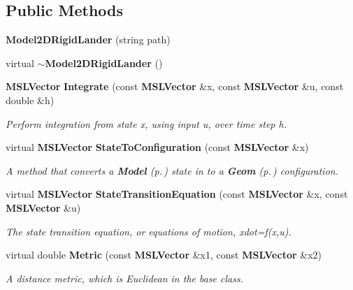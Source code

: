 \subsection*{Public Methods}
\begin{CompactItemize}
\item 
{\bf Model2DRigid\-Lander} (string path)
\item 
virtual {\bf $\sim$Model2DRigid\-Lander} ()
\item 
{\bf MSLVector} {\bf Integrate} (const {\bf MSLVector} \&x, const {\bf MSLVector} \&u, const double \&h)
\begin{CompactList}\small\item\em Perform integration from state x, using input u, over time step h.\item\end{CompactList}\item 
virtual {\bf MSLVector} {\bf State\-To\-Configuration} (const {\bf MSLVector} \&x)
\begin{CompactList}\small\item\em A method that converts a {\bf Model} {\rm (p.\,\pageref{class_Model})} state in to a {\bf Geom} {\rm (p.\,\pageref{class_Geom})} configuration.\item\end{CompactList}\item 
virtual {\bf MSLVector} {\bf State\-Transition\-Equation} (const {\bf MSLVector} \&x, const {\bf MSLVector} \&u)
\begin{CompactList}\small\item\em The state transition equation, or equations of motion, xdot=f(x,u).\item\end{CompactList}\item 
virtual double {\bf Metric} (const {\bf MSLVector} \&x1, const {\bf MSLVector} \&x2)
\begin{CompactList}\small\item\em A distance metric, which is Euclidean in the base class.\item\end{CompactList}\end{CompactItemize}
